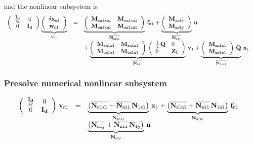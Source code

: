 \documentclass[10pt,a4paper]{article}
\begin{document}
%
and the nonlinear subsystem is 
%
\begin{equation}
\begin{array}{rcl}
\left(
\begin{array}{cc}
\frac{\mathbf{I_d}}{\delta t} & 0 \\
0 & \mathbf{I_d}
\end{array}
\right)\underbrace{\left(\begin{array}{c}
\delta {\mathbf{x}}_{\mathtt{nl}} \\
{\mathbf{w}}_{\mathtt{nl}}
\end{array}\right) 
}_{\mathbf{v}_{\mathtt{nl}}}
&=&
  \underbrace{\left(\begin{array}{ll}
\mathbf{M}_{\mathtt{xnlxnl}}& \mathbf{M}_{\mathtt{xnlwnl}} \\ 
 \mathbf{M}_{\mathtt{wnlxnl}}& \mathbf{M}_{\mathtt{wnlwnl}} 
\end{array}\right)}_{\overline{\mathbf{N}_{\mathtt{nlnl}}}}
\,
\mathbf{f}_{\mathtt{nl}}
+
  \underbrace{\left(\begin{array}{l}
 \mathbf{M}_{\mathtt{xnly}}\\ 
 \mathbf{M}_{\mathtt{wnly}}
\end{array}\right)}_{\overline{\mathbf{N}_{\mathtt{nly}}}}
\,
{\mathbf{u}} \\
 && +
\underbrace{ \left(\begin{array}{ll}
\mathbf{M}_{\mathtt{xnlxl}}&\mathbf{M}_{\mathtt{xnlwl}} \\ 
\mathbf{M}_{\mathtt{wnlxl}}&\mathbf{M}_{\mathtt{wnlwl}} 
\end{array}\right)\,\left(\begin{array}{ll}
\frac{1}{2}\,\mathbf{Q}&0 \\ 
0 &\mathbf{Z}_{\mathtt{l}}
\end{array}\right)}_{\overline{\mathbf{N}_{\mathtt{nll}}}}
\, 
\mathbf{v}_{\mathtt{l}}
+
\underbrace{\left(\begin{array}{ll}
\mathbf{M}_{\mathtt{xnlxl}}\\ 
\mathbf{M}_{\mathtt{wnlxl}}
\end{array}\right)\,\mathbf{Q}}_{\overline{\mathbf{N}_{\mathtt{nlxl}}}}
\, 
{\mathbf{x}}_{\mathtt{l}}
\end{array}
\end{equation}
\subsubsection{Presolve numerical nonlinear subsystem}
\begin{equation}
\begin{array}{rcl}
\left(
\begin{array}{cc}
\frac{\mathbf{I_d}}{\delta t} & 0 \\
0 & \mathbf{I_d}
\end{array}
\right)\,
\mathbf{v}_{\mathtt{nl}} &=& \underbrace{\left(\overline{\mathbf{N}_{\mathtt{nlxl}}} + \overline{\mathbf{N}_{\mathtt{nll}}}\,{\mathbf{N}_{\mathtt{lxl}}}\right)}_{\mathbf{N}_{\mathtt{nlxl}}}\,{\mathbf{x}}_{\mathtt{l}} + \underbrace{\left(\overline{\mathbf{N}_{\mathtt{nlnl}}} + \overline{\mathbf{N}_{\mathtt{nll}}}\,{\mathbf{N}_{\mathtt{lnl}}}\right)}_{\mathbf{N}_{\mathtt{nlnl}}}\,\mathbf{f}_{\mathtt{nl}}\\
&& \underbrace{\left(\overline{\mathbf{N}_{\mathtt{nly}}}+ \overline{\mathbf{N}_{\mathtt{nll}}}\,{\mathbf{N}_{\mathtt{ly}}}\right)}_{\mathbf{N}_{\mathtt{nly}}}\,{\mathbf{u}}
\end{array}
\end{equation}
%
\end{document}
